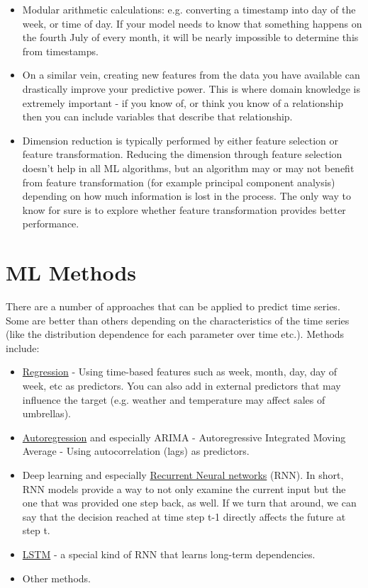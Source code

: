 \documentclass[11pt,fleqn]{book} %
\begin{document}
\begin{itemize}
\item Modular arithmetic calculations: e.g. converting a timestamp into day of the week, or time of day. If your model needs to know that something happens on the fourth July of every month, it will be nearly impossible to determine this from timestamps.

\item On a similar vein, creating new features from the data you have available can drastically improve your predictive power. This is where domain knowledge is extremely important - if you know of, or think you know of a relationship then you can include variables that describe that relationship. 

\item Dimension reduction is typically performed by either feature selection or feature transformation. Reducing the dimension through feature selection doesn't help in all ML algorithms, but an algorithm may or may not benefit from feature transformation (for example principal component analysis) depending on how much information is lost in the process. The only way to know for sure is to explore whether feature transformation provides better performance.
\end{itemize}

\section{ML Methods}

There are a number of approaches that can be applied to predict time series. Some are better than others depending on the characteristics of the time series (like the distribution dependence for each parameter over time etc.). Methods include:
\begin{itemize}
\item \href{}{Regression} - Using time-based features such as week, month, day, day of week, etc as predictors. You can also add in external predictors that may influence the target (e.g. weather and temperature may affect sales of umbrellas).
\item \href{}{Autoregression} and especially ARIMA - Autoregressive Integrated Moving Average - Using autocorrelation (lags) as predictors.
\item Deep learning and especially \href{}{Recurrent Neural networks} (RNN). In short, RNN models provide a way to not only examine the current input but the one that was provided one step back, as well. If we turn that around, we can say that the decision reached at time step t-1 directly affects the future at step t. 
\item \href{}{LSTM} - a special kind of RNN that learns long-term dependencies. 
\item Other methods.
\end{itemize}
\end{document}
